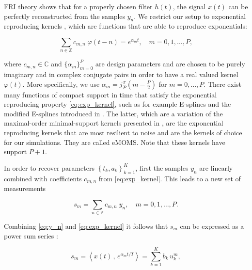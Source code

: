\documentclass{article}
\begin{document}
FRI theory \cite{vetterli2002,dragotti2005,dragotti2007,tur2011} shows that for a properly chosen filter $h(t)$, 
the signal $x(t)$ can be perfectly reconstructed from the samples $y_n$.
We restrict our setup to exponential reproducing kernels \cite{dragotti2007}, which are functions 
that are able to reproduce exponentials:

\begin{equation}
\sum_{n \in \mathbb{Z}} c_{m,n} \; \varphi(t-n) = e^{\alpha_mt}, \quad m = 0,1, \ldots, P,
\label{eq:exp_kernel}
\end{equation}

\noindent
where $c_{m,n} \in \mathbb{C}$ and $\{\alpha_m\}_{m=0}^{P}$ are design parameters and are chosen
to be purely imaginary and in complex conjugate pairs in order to have a real valued
kernel $\varphi(t)$. More specifically, we use 
$\alpha_m =  j\tfrac{\pi}{P}(m-\tfrac{P}{2})$ for $m=0,\dots,P$.
There exist many functions of compact support in time that satisfy the 
exponential reproducing property \eqref{eq:exp_kernel}, such as for example E-splines \cite{dragotti2007} 
and the modified E-splines introduced in \cite{uriguen2011}. The latter, which are a variation 
of the maximal-order minimal-support kernels presented in \cite{blu2001}, 
are the exponential reproducing kernels that are most resilient to noise \cite{uriguen2011,uriguen2013}
and are the kernels of choice for our simulations. They are called eMOMS. 
Note that these kernels have support $P+1$.


In order to recover parameters $\left\lbrace t_k, a_k \right\rbrace_{k=1}^{K}$, first the samples 
$y_n$ are linearly combined with coefficients $c_{m,n}$ from \eqref{eq:exp_kernel}.
This leads to a new set of measurements 

\begin{equation}
s_m = \sum_{n \in \mathbb{Z}} c_{m,n} \; y_n, \quad m = 0, 1, \ldots, P.
\label{eq:s_m}
\end{equation}

\noindent
Combining \eqref{eq:y_n} and \eqref{eq:exp_kernel} it follows that $s_m$ can be expressed 
as a power sum series \cite{dragotti2007}:

\begin{equation}
s_m 
= \left\langle x(t) \, , \, e^{\alpha_m t / T} \right\rangle
= \sum_{k=1}^{K} b_k \, u_k^m,
\end{equation}
\end{document}
